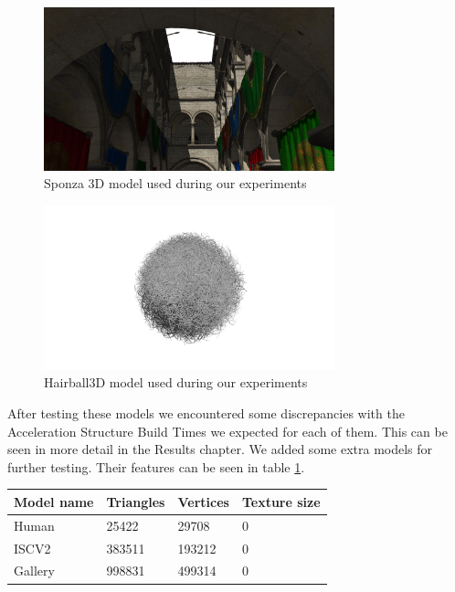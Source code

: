 \begin{figure}[hbt!]
  \centering
  \includegraphics[width=0.75\textwidth]{figuras/sponza.png}
  \caption{Sponza 3D model used during our experiments}
  \label{sponza-screenshot}
\end{figure}
\begin{figure}[hbt!]
  \centering
  \includegraphics[width=0.75\textwidth]{figuras/hairball.png}
  \caption{Hairball3D model used during our experiments}
  \label{hairball-screenshot}
\end{figure}

After testing these models we encountered some discrepancies with the Acceleration Structure Build Times we expected for each of them. This can be seen in more detail in the Results chapter. We added some extra models for further testing. Their features can be seen in table \ref{extra-scenes-geometry-table}.

\begin{center}
  \begin{table}
  \begin{tabular}{ | m{3cm} | m{3cm}| m{3cm}|m{3cm} |}
  \hline
  Model name& Triangles& Vertices& Texture size\\
  \hline
    Human& 25422& 29708& 0\\
  \hline
    ISCV2& 383511& 193212& 0\\
  \hline
    Gallery& 998831& 499314& 0\\
  \hline
\end{tabular}
\label{extra-scenes-geometry-table}
\end{table}
\end{center}

